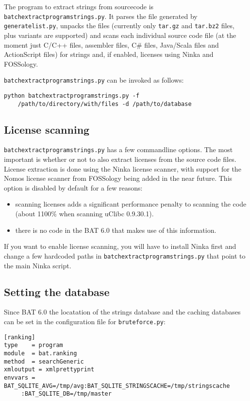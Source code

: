 \documentclass[10pt]{article}
\begin{document}
The program to extract strings from sourcecode is
\texttt{batchextractprogramstrings.py}. It parses the file generated by
\texttt{generatelist.py}, unpacks the files (currently only \texttt{tar.gz}
and \texttt{tar.bz2} files, plus variants are supported) and scans each
individual source code file (at the moment just C/C++ files, assembler files,
C\# files, Java/Scala files and ActionScript files) for strings and, if
enabled, licenses using Ninka and FOSSology.

\texttt{batchextractprogramstrings.py} can be invoked as follows:

\begin{verbatim}
python batchextractprogramstrings.py -f
    /path/to/directory/with/files -d /path/to/database
\end{verbatim}

\subsection{License scanning}

\texttt{batchextractprogramstrings.py} has a few commandline options. The most
important is whether or not to also extract licenses from the source code files.
License extraction is done using the Ninka license scanner, with support
for the Nomos license scanner from FOSSology being added in the near future.
This option is disabled by default for a few reasons:

\begin{itemize}
\item scanning licenses adds a significant performance penalty to scanning the
code (about 1100\% when scanning uClibc 0.9.30.1).
\item there is no code in the BAT 6.0 that makes use of this information.
\end{itemize}

If you want to enable license scanning, you will have to install Ninka first
and change a few hardcoded paths in \texttt{batchextractprogramstrings.py} that
point to the main Ninka script.

\subsection{Setting the database}

Since BAT 6.0 the locatation of the strings database and the caching databases can
be set in the configuration file for \texttt{bruteforce.py}:

\begin{verbatim}
[ranking]
type    = program
module  = bat.ranking
method  = searchGeneric
xmloutput = xmlprettyprint
envvars = BAT_SQLITE_AVG=/tmp/avg:BAT_SQLITE_STRINGSCACHE=/tmp/stringscache
     :BAT_SQLITE_DB=/tmp/master
\end{verbatim}
\end{document}

